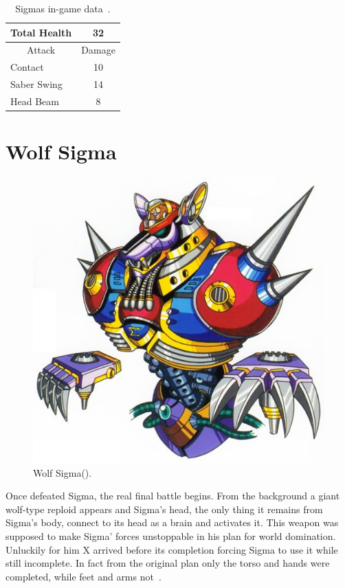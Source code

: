 \begin{table}
	\centering
	\begin{tabular}[h]{l c}
		\toprule
		Total Health  & 32\\
		\midrule
		\multicolumn{1}{c}{Attack} & \multicolumn{1}{c}{Damage}\\
		Contact & 10\\
		Saber Swing & 14\\
		Head Beam& 8\\
		\bottomrule
	\end{tabular}
	\caption{Sigmas in-game data~\cite{wiki:Sigma}.}
\end{table}

\section{Wolf Sigma}\label{boss:wolf_sigma}
\begin{figure}[htp]
	\centering
	\includegraphics[width=0.4\linewidth]{figures/X1/Sigma_stages/WolfSigma.jpg}
	\caption{Wolf Sigma(\cite{book:MMX_Complete_art}).}
\end{figure}
Once defeated Sigma, the real final battle begins. From the background a giant wolf-type reploid appears and Sigma's head, the only thing it remains from Sigma's body, connect to its head as a brain and activates it. This weapon was supposed to make Sigma' forces unstoppable in his plan for world domination. Unluckily for him X arrived before its completion forcing Sigma to use it while still incomplete. In fact from the original plan only the torso and hands were completed, while feet and arms not~\cite{wayback:X_resources}.

